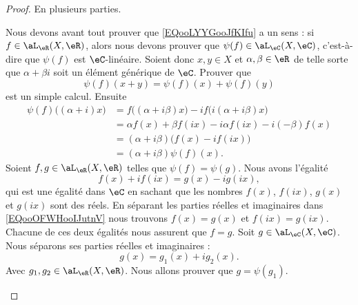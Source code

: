 \begin{proof}
    En plusieurs parties.
    \begin{subproof}
        Nous devons avant tout prouver que \eqref{EQooLYYGooJfKIfu} a un sens : si \( f\in \aL_{\eR}(X,\eR)\), alors nous devons prouver que \( \psi(f)\in\aL_\eC(X,\eC)\), c'est-à-dire que \( \psi(f)\) est \( \eC\)-linéaire. Soient donc \( x,y\in X\) et \( \alpha,\beta\in \eR\) de telle sorte que \( \alpha+\beta i\) soit un élément générique de \( \eC\). Prouver que
        \begin{equation}
            \psi(f)(x+y)=\psi(f)(x)+\psi(f)(y)
        \end{equation}
        est un simple calcul. Ensuite
        \begin{subequations}
            \begin{align}
                \psi(f)\big( (\alpha+i)x \big) & =f\big( (\alpha+i\beta)x \big)-if\big( i(\alpha+i\beta)x \big) \\
                                               & =\alpha f(x)+\beta f(ix)-i\alpha f(ix)-i(-\beta)f(x)           \\
                                               & =(\alpha+i\beta)\big( f(x)-if(ix) \big)                        \\
                                               & =(\alpha+i\beta)\psi(f)(x).
            \end{align}
        \end{subequations}
        Soient \( f,g\in \aL_{\eR}(X,\eR)\) telles que \( \psi(f)=\psi(g)\). Nous avons l'égalité
        \begin{equation}        \label{EQooOFWHooIJutnV}
            f(x)+if(ix)=g(x)-ig(ix),
        \end{equation}
        qui est une égalité dans \( \eC\) en sachant que les nombres \( f(x)\), \( f(ix)\), \( g(x)\) et \( g(ix)\) sont des réels. En séparant les parties réelles et imaginaires dans \eqref{EQooOFWHooIJutnV} nous trouvons \( f(x)=g(x)\) et \( f(ix)=g(ix)\). Chacune de ces deux égalités nous assurent que \( f=g\).
        Soit \( g\in \aL_{\eC}(X,\eC)\). Nous séparons ses parties réelles et imaginaires :
        \begin{equation}
            g(x)=g_1(x)+ig_2(x).
        \end{equation}
        Avec \( g_1,g_2\in \aL_{\eR}(X,\eR)\). Nous allons prouver que \( g=\psi(g_1)\).


\end{subproof}
\end{proof}
